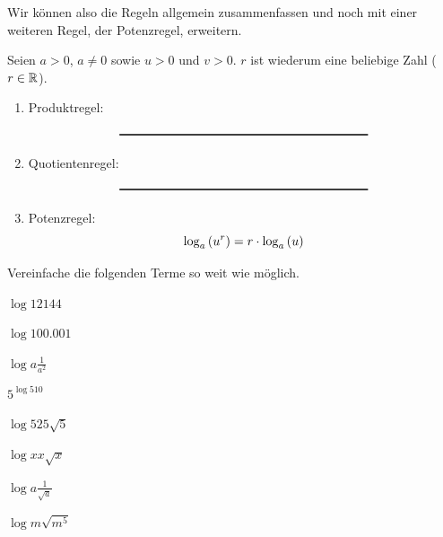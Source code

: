 \documentclass[11pt,oneside]{article}
\begin{document}
	Wir können also die Regeln allgemein zusammenfassen und noch mit einer weiteren Regel, der Potenzregel, erweitern.
	\begin{satz}
		\label{satz:logarithmusgesetze}
		Seien $a>0$, $a\neq0$ sowie $u>0$ und $v>0$. $r$ ist wiederum eine beliebige Zahl ($r\in\mathbb{R}$).
		\begin{enumerate}[label=\Roman*.]
			\item Produktregel: \[\gap{7}\]
			\item Quotientenregel: \[\gap{7}\]
			\item Potenzregel: \[\log{a}{u^r}=r\*\log{a}{u}\]
		\end{enumerate}
	\end{satz}
	\begin{aufgabe}
		Vereinfache die folgenden Terme so weit wie möglich.
		\begin{enumcols}[4]
				\item $\log{12}{144}$
				\item $\log{10}{0.001}$
				\item $\log{a}{\frac{1}{a^2}}$
				\item $5^{\log{5}{10}}$
				\item $\log{5}{25\sqrt{5}}$
				\item $\log{x}{x\sqrt{x}}$
				\item $\log{a}{\frac{1}{\sqrt{a}}}$
				\item $\log{m}{\sqrt{m^5}}$
		\end{enumcols}
	\end{aufgabe}
\end{document}
